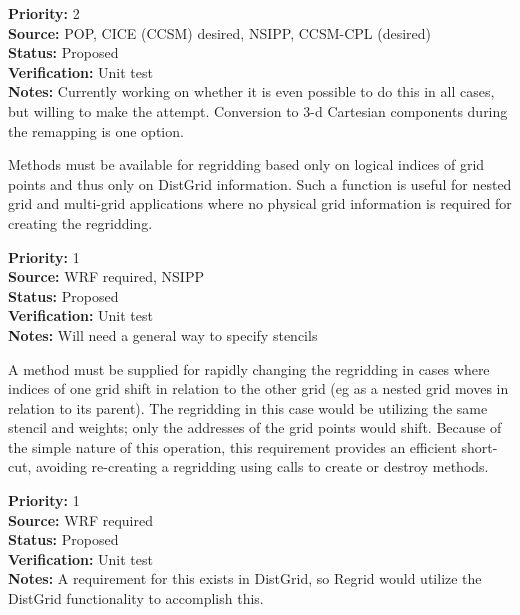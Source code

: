 \begin{reqlist}
{\bf Priority:} 2 \\
{\bf Source:}  POP, CICE (CCSM) desired, NSIPP, CCSM-CPL (desired) \\
{\bf Status:} Proposed \\
{\bf Verification:} Unit test \\
{\bf Notes:} Currently working on whether it is even possible to do this
             in all cases, but willing to make the attempt.  Conversion to
             3-d Cartesian components during the remapping is one option.
\end{reqlist}


Methods must be available for regridding based
only on logical indices of grid points and thus only on DistGrid information.  
Such a function is useful for nested grid and multi-grid applications where 
no physical grid information is required for creating the regridding.

\begin{reqlist}
{\bf Priority:} 1 \\
{\bf Source:}  WRF required, NSIPP \\
{\bf Status:} Proposed \\
{\bf Verification:} Unit test \\
{\bf Notes:} Will need a general way to specify stencils
\end{reqlist}


A method must be supplied for rapidly changing the
regridding in cases where indices of one grid shift in relation 
to the other grid (eg as a nested grid moves in relation to its 
parent).  The regridding in this case would be utilizing the
same stencil and weights; only the addresses of the grid points
would shift.  Because of the simple nature of this operation,
this requirement provides an efficient short-cut, avoiding
re-creating a regridding using calls to create or destroy methods.

\begin{reqlist}
{\bf Priority:} 1 \\
{\bf Source:}  WRF required \\
{\bf Status:} Proposed \\
{\bf Verification:} Unit test \\
{\bf Notes:} A requirement for this exists in DistGrid, so
             Regrid would utilize the DistGrid functionality to 
             accomplish this.
\end{reqlist}

